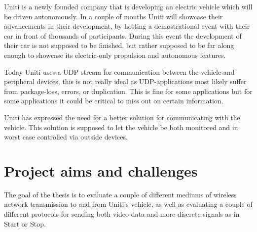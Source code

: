 \documentclass[a4paper]{article}
\begin{document}
Uniti is a newly founded company that is developing an electric vehicle which will be driven autonomously.
In a couple of months Uniti will showcase their advancements in their development,
by hosting a demostrational event with their car in front of thousands of participants.
During this event the development of their car is not supposed to be finished, 
but rather supposed to be far along enough to showcase its electric-only propulsion and autonomous features. 

Today Uniti uses a UDP stream for communication between the vehicle and
peripheral devices, this is not really ideal as UDP-applications most likely
suffer from package-loss, errors, or duplication. This is fine for some
applications but for some applications it could be critical to miss out on certain information.

Uniti has expressed the need for a better solution for communicating with the vehicle.
This solution is supposed to let the vehicle be both monitored and in worst case controlled via outside devices.


%

\section{Project aims and challenges}


The goal of the thesis is to evaluate a couple of different mediums of wireless
network transmission to and from Uniti's vehicle, as well as evaluating a couple
of different protocols for sending both video data and more discrete signals as
in Start or Stop.
\end{document}

